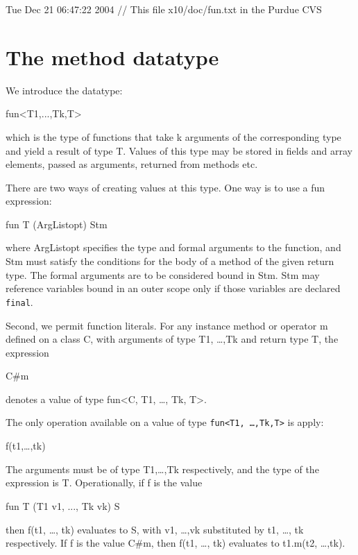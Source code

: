 Tue Dec 21 06:47:22 2004
// This file x10/doc/fun.txt in the Purdue CVS

\section{The {\cf method} datatype}

We introduce the datatype:

\begin{x10}
   fun<T1,...,Tk,T>  
\end{x10}

\noindent which is the type of functions that take k arguments of the
corresponding type and yield a result of type T. Values of this type
may be stored in fields and array elements, passed as arguments,
returned from methods etc.

There are two ways of creating values at this type.  One way is to use
a {\cf fun} expression:
\begin{x10}
     fun T (ArgListopt) {Stm}  
\end{x10}

\noindent where {\cf ArgListopt} specifies the type and formal
arguments to the function, and {\cf Stm} must satisfy the conditions
for the body of a method of the given return type. The formal
arguments are to be considered bound in {\cf Stm}. {\cf Stm} may
reference variables bound in an outer scope only if those variables
are declared {\tt final}.

Second, we permit function literals. For any instance method or
operator {\cf m} defined on a class {\cf C}, with arguments of type
{\cf T1, \ldots ,Tk} and return type {\cf T}, the expression

\begin{x10}
     C#m  
\end{x10}
\noindent denotes a value of type {\cf fun<C, T1, \ldots , Tk, T>}. 

The only operation available on a value of type {\tt fun<T1, \ldots ,Tk,T>} is apply:

\begin{x10}
    f(t1,\ldots,tk)  
\end{x10}

\noindent The arguments must be of type {\cf T1,\ldots ,Tk}
respectively, and the type of the expression is {\cf
T}. Operationally, if {\cf f} is the value
\begin{x10}
   fun T (T1 v1, ..., Tk vk) {S}  
\end{x10}
\noindent then {\cf f(t1, \ldots, tk)} evaluates to {\cf S}, with {\cf
v1, \ldots ,vk} substituted by {\cf t1, \ldots, tk} respectively. If
{\cf f} is the value {\cf C\#m}, then {\cf f(t1, \ldots, tk)}
evaluates to {\cf t1.m(t2, \ldots ,tk)}.

